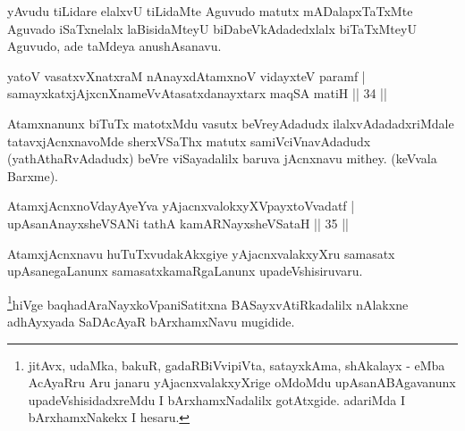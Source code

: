 \begin{artha}
yAvudu tiLidare elalxvU tiLidaMte Aguvudo matutx mADalapxTaTxMte Aguvado iSaTxnelalx laBisidaMteyU biDabeVkAdadedxlalx biTaTxMteyU Aguvudo, ade taMdeya anushAsanavu.
\end{artha}


\begin{shl}
yatoV vasatxvXnatxraM nAnayxdAtamxnoV vidayxteV paramf |\\
samayxkatxjAjxcnXnameVvAtasatxdanayxtarx maqSA matiH \hfill || 34 || 
\end{shl}

\begin{artha}
Atamxnanunx biTuTx matotxMdu vasutx beVreyAdadudx ilalxvAdadadxriMdale tatavxjAcnxnavoMde sherxVSaThx matutx samiVciVnavAdadudx (yathAthaRvAdadudx) beVre viSayadalilx baruva jAcnxnavu mithey. (keVvala Barxme).
\end{artha}


\begin{shl}
AtamxjAcnxnoVdayAyeYva yAjacnxvalokxyXV\s payxtoV\s vadatf |\\
upAsanAnayxsheVSANi tathA kamARNayxsheVSataH \hfill || 35 || 
\end{shl}

\begin{artha}
AtamxjAcnxnavu huTuTxvudakAkxgiye yAjacnxvalakxyXru samasatx upAsanegaLanunx samasatxkamaRgaLanunx upadeVshisiruvaru.
\end{artha}

\begin{artha}
\footnote{jitAvx, udaMka, bakuR, gadaRBiVvipiVta, satayxkAma, shAkalayx - eMba AcAyaRru Aru janaru yAjacnxvalakxyXrige oMdoMdu upAsanABAgavanunx upadeVshisidadxreMdu I bArxhamxNadalilx gotAtxgide. adariMda I bArxhamxNakekx I hesaru.}hiVge baqhadAraNayxkoVpaniSatitxna BASayxvAtiRkadalilx nAlakxne adhAyxyada SaDAcAyaR bArxhamxNavu mugidide.
\end{artha}
